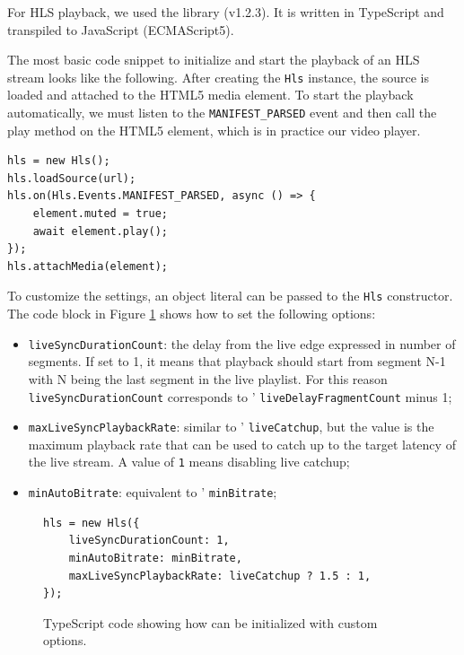 For HLS playback, we used the \hlsjs{} library (v1.2.3). It is written in TypeScript and transpiled to JavaScript (ECMAScript5).

The most basic code snippet to initialize \hlsjs{} and start the playback of an HLS stream looks like the following. After creating the \texttt{Hls} instance, the source is loaded and attached to the HTML5 media element. To start the playback automatically, we must listen to the \texttt{MANIFEST\_PARSED} event and then call the play method on the HTML5 element, which is in practice our video player.

\begin{verbatim}
hls = new Hls();
hls.loadSource(url);
hls.on(Hls.Events.MANIFEST_PARSED, async () => {
    element.muted = true;
    await element.play();
});
hls.attachMedia(element);
\end{verbatim}

To customize the settings, an object literal can be passed to the \texttt{Hls} constructor. The code block in Figure \ref{fig:hlsjs_settings} shows how to set the following options:

\begin{itemize}
    \item \texttt{liveSyncDurationCount}: the delay from the live edge expressed in number of segments. If set to 1, it means that playback should start from segment N-1 with N being the last segment in the live playlist. For this reason \texttt{liveSyncDurationCount} corresponds to \dashjs{}' \texttt{liveDelayFragmentCount} minus 1;
    \item \texttt{maxLiveSyncPlaybackRate}: similar to \dashjs{}' \texttt{liveCatchup}, but the value is the maximum playback rate that can be used to catch up to the target latency of the live stream. A value of \texttt{1} means disabling live catchup;
    \item \texttt{minAutoBitrate}: equivalent to \dashjs{}' \texttt{minBitrate};
\end{itemize}

\begin{figure}[h]
    \centering
    \begin{verbatim}
hls = new Hls({
    liveSyncDurationCount: 1,
    minAutoBitrate: minBitrate,
    maxLiveSyncPlaybackRate: liveCatchup ? 1.5 : 1,
});
    \end{verbatim}
    \caption{TypeScript code showing how \hlsjs{} can be initialized with custom options.}
    \label{fig:hlsjs_settings}
\end{figure}

